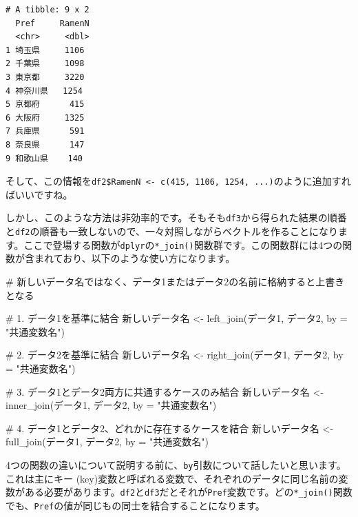 \documentclass[
  a4paper,
  pandoc,
  ja=standard,
  jafont=haranoaji]{bxjsbook}
\newenvironment{Shaded}{\begin{snugshade}}{\end{snugshade}}
\newcommand{\AttributeTok}[1]{\textcolor[rgb]{0.00,0.48,0.65}{#1}}
\newcommand{\CommentTok}[1]{\textcolor[rgb]{0.37,0.37,0.37}{#1}}
\newcommand{\FunctionTok}[1]{\textcolor[rgb]{0.28,0.35,0.67}{#1}}
\newcommand{\NormalTok}[1]{\textcolor[rgb]{0.00,0.48,0.65}{#1}}
\newcommand{\OtherTok}[1]{\textcolor[rgb]{0.00,0.48,0.65}{#1}}
\newcommand{\StringTok}[1]{\textcolor[rgb]{0.13,0.47,0.30}{#1}}
\begin{document}
\begin{verbatim}
# A tibble: 9 x 2
  Pref     RamenN
  <chr>     <dbl>
1 埼玉県     1106
2 千葉県     1098
3 東京都     3220
4 神奈川県   1254
5 京都府      415
6 大阪府     1325
7 兵庫県      591
8 奈良県      147
9 和歌山県    140
\end{verbatim}

そして、この情報を\texttt{df2\$RamenN\ \textless{}-\ c(415,\ 1106,\ 1254,\ ...)}のように追加すればいいですね。

しかし、このような方法は非効率的です。そもそも\texttt{df3}から得られた結果の順番と\texttt{df2}の順番も一致しないので、一々対照しながらベクトルを作ることになります。ここで登場する関数が\texttt{dplyr}の\texttt{*\_join()}関数群です。この関数群には4つの関数が含まれており、以下のような使い方になります。

\begin{Shaded}
\begin{Highlighting}[numbers=left,,]
\CommentTok{\# 新しいデータ名ではなく、データ1またはデータ2の名前に格納すると上書きとなる}

\CommentTok{\# 1. データ1を基準に結合}
\NormalTok{新しいデータ名 }\OtherTok{\textless{}{-}}  \FunctionTok{left\_join}\NormalTok{(データ1, データ2, }\AttributeTok{by =} \StringTok{"共通変数名"}\NormalTok{)}

\CommentTok{\# 2. データ2を基準に結合}
\NormalTok{新しいデータ名 }\OtherTok{\textless{}{-}} \FunctionTok{right\_join}\NormalTok{(データ1, データ2, }\AttributeTok{by =} \StringTok{"共通変数名"}\NormalTok{)}

\CommentTok{\# 3. データ1とデータ2両方に共通するケースのみ結合}
\NormalTok{新しいデータ名 }\OtherTok{\textless{}{-}} \FunctionTok{inner\_join}\NormalTok{(データ1, データ2, }\AttributeTok{by =} \StringTok{"共通変数名"}\NormalTok{)}

\CommentTok{\# 4. データ1とデータ2、どれかに存在するケースを結合}
\NormalTok{新しいデータ名 }\OtherTok{\textless{}{-}}  \FunctionTok{full\_join}\NormalTok{(データ1, データ2, }\AttributeTok{by =} \StringTok{"共通変数名"}\NormalTok{)}
\end{Highlighting}
\end{Shaded}

4つの関数の違いについて説明する前に、\texttt{by}引数について話したいと思います。これは主にキー
(key)変数と呼ばれる変数で、それぞれのデータに同じ名前の変数がある必要があります。\texttt{df2}と\texttt{df3}だとそれが\texttt{Pref}変数です。どの\texttt{*\_join()}関数でも、\texttt{Pref}の値が同じもの同士を結合することになります。
\end{document}
